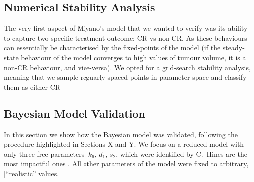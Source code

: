 \documentclass[11pt]{article}
\begin{document}
\subsection{Numerical Stability Analysis}
The very first aspect of Miyano's model that we wanted to verify was its ability to capture two specific treatment outcome: CR vs non-CR. As these behaviours can essentially be characterised by the fixed-points of the model (if the steady-state behaviour of the model converges to high values of tumour volume, it is a non-CR behaviour, and vice-versa). We opted for a grid-search stability analysis, meaning that we sample reguarly-spaced points in parameter space and classify them as either CR 
\subsection{Bayesian Model Validation}
In this section we show how the Bayesian model was validated, following the procedure highlighted in Sections X and Y. We focus on a reduced model with only three free parameters, $k_6$, $d_1$, $s_2$, which were identified by C.~Hines are the most impactful ones \cite{christian1}. All other parameters of the model were fixed to arbitrary, |``realistic'' values. 
\end{document}
